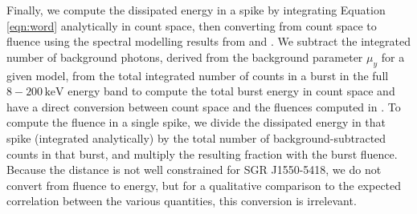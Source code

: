 \documentclass[12pt]{emulateapj}
\newcommand{\counts}{y}
\begin{document}
 Finally, we compute the dissipated energy in a spike by integrating Equation \ref{eqn:word} analytically in count space,
 then converting from count space to fluence using the spectral modelling results from \citet{vanderhorst2012} and \citet{vonkienlin2012}. We subtract the integrated number of 
 background photons, derived from the background parameter $\mu_\counts$ for a given model, from the total integrated number of 
 counts in a burst in the full $8-200\,\mathrm{keV}$ energy band to compute the total burst energy in count space and have a direct conversion between count space and 
 the fluences computed in \citet{vanderhorst2012}. To compute the fluence in a single spike, we divide the dissipated energy in that spike (integrated analytically)
 by the total number of background-subtracted counts in that burst, and multiply the resulting fraction with the burst fluence. 
 Because the distance is not well constrained for SGR J1550-5418, we do not convert from fluence to energy, but for a qualitative comparison to the expected correlation between the various quantities, this conversion is irrelevant.
 
\end{document}
